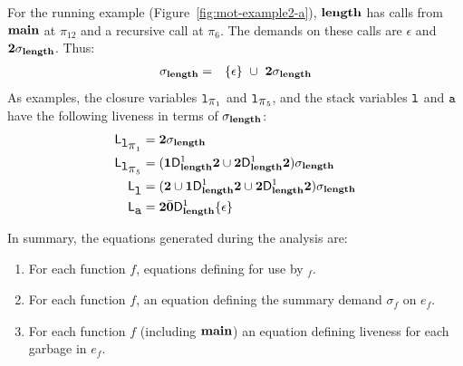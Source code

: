 \documentclass[9pt,preprint,nonatbib]{sigplanconf}
\begin{document}
For  the  running  example (Figure~\ref{fig:mot-example2-a}),  $\mathbf{length}$  has  calls  from  $\mathbf{main}$  at
$\pi_{12}$ and a recursive call at $\pi_6$. The demands on these calls
are $\epsilon$ and ${\mathbf{2}}\sigma_{\mathit{\mathbf{length}}}$. Thus:
\begin{eqnarray*}
\sigma_{\mathbf{length}}    &=&
 \{\epsilon\}  ~\cup~{{\mathbf{2}}\sigma_{\mathit{\mathbf{length}}}}
\end{eqnarray*}
As examples, the closure variables $\mbox{\tt l}_{\mbox{$\pi$}_1}$ and $\mbox{\tt l}_{\mbox{$\pi$}_5}$, and the
stack variables $\mbox{\tt l}$ and $\mbox{\tt a}$ have the following liveness in terms
of  $\sigma_{\mathbf{length}}$:
\begin{align*}
  \mathsf{L}_{\mbox{\tt l}_{\mbox{$\pi$}_1}} &= {\mathbf{2}}\sigma_{\mathit{\mathbf{length}}} \\
  \mathsf{L}_{\mbox{\tt l}_{\mbox{$\pi$}_5}} &=  (\mathbf{1}\mathsf{D}_{\mathit {\mathbf{length}}}^{1}{{\mathbf{2}}} \cup
  {\mathbf{2}}\mathsf{D}_{\mathit {\mathbf{length}}}^{1}{{\mathbf{2}}}) \sigma_{\mathit{\mathbf{length}}} \\
  \mathsf{L}_{{\mbox{\tt l}}}^{} &= ({\mathbf{2}} \cup \mathbf{1}\mathsf{D}_{\mathit {\mathbf{length}}}^{1}{\mathbf{2}}
  \cup {\mathbf{2}}\mathsf{D}_{\mathit {\mathbf{length}}}^{1}{{\mathbf{2}}})\sigma_{\mathit{\mathbf{length}}} \\
  \mathsf{L}_{{\mbox{\tt a}}}^{} &= {\mathbf{2}} \bar{\mathbf{0}} \mathsf{D}_{\mathit {\mathbf{length}}}^{1}\{\epsilon\}
\end{align*}

In  summary, the  equations  generated during the
analysis are:
\begin{enumerate}
\item   For  each   function  $\mathit{f}$,   equations
  defining  for use by \Lfonly$_{\mathit f}$.
\item For each function $\mathit{f}$, an equation defining the summary
  demand $\sigma_{\mathit f}$ on $e_f$.
\item   For  each   function  $\mathit{f}$   (including
  $\mathbf{main}$) an  equation  defining
  liveness for each garbage in  $e_{\mathit f}$.
\end{enumerate}

\end{document}
